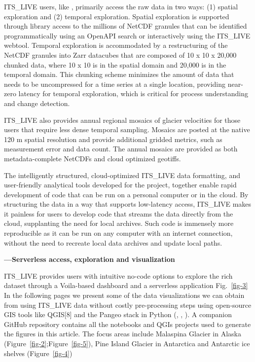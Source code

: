 \documentclass[
  super,
  preprint,
  3p,
  twocolumn]{elsarticle}
\begin{document}
ITS\_LIVE users, like \citep[most Earth
Scientists][]{Fouilloux2018-jw, Marshall2022-je, Lopez2021-el},
primarily access the raw data in two ways: (1) spatial exploration and
(2) temporal exploration. Spatial exploration is supported through
library access to the millions of NetCDF granules that can be identified
programmatically using an OpenAPI search or interactively using the
ITS\_LIVE webtool. Temporal exploration is accommodated by a
restructuring of the NetCDF granules into Zarr datacubes that are
composed of 10 x 10 x 20,000 chunked data, where 10 x 10 is in the
spatial domain and 20,000 is in the temporal domain. This chunking
scheme minimizes the amount of data that needs to be uncompressed for a
time series at a single location, providing near-zero latency for
temporal exploration, which is critical for process understanding and
change detection.

ITS\_LIVE also provides annual regional mosaics of glacier velocities
for those users that require less dense temporal sampling. Mosaics are
posted at the native 120 m spatial resolution and provide additional
gridded metrics, such as measurement error and data count. The annual
mosaics are provided as both metadata-complete NetCDFs and cloud
optimized geotiffs.

\newpage{}

The intelligently structured, cloud-optimized ITS\_LIVE data formatting,
and user-friendly analytical tools developed for the project, together
enable rapid development of code that can be run on a personal computer
or in the cloud. By structuring the data in a way that supports
low-latency access, ITS\_LIVE makes it painless for users to develop
code that streams the data directly from the cloud, supplanting the need
for local archives. Such code is immensely more reproducible as it can
be run on any computer with an internet connection, without the need to
recreate local data archives and update local paths.

\textbf{---Serverless access, exploration and visualization}

ITS\_LIVE provides users with intuitive no-code options to explore the
rich dataset through a Voila-based dashboard and a serverless
application Fig.~\ref{fig-3} In the following pages we present some of
the data visualizations we can obtain from using ITS\_LIVE data without
costly pre-processing steps using open-source GIS tools like QGIS{[}8{]}
and the Pangeo stack in Python (\citep[Xarray][]{Hoyer2017-su},
\citep[Zarr][]{Miles2023-yj} , \citep[HoloViews][]{Rudiger2020-yr}). A
companion GitHub repository contains all the notebooks and QGIs projects
used to generate the figures in this article. The focus areas include
Malaspina Glacier in Alaska (Figure~\ref{fig-2};Figure~\ref{fig-5}),
Pine Island Glacier in Antarctica and Antarctic ice shelves
(Figure~\ref{fig-4})
\end{document}
